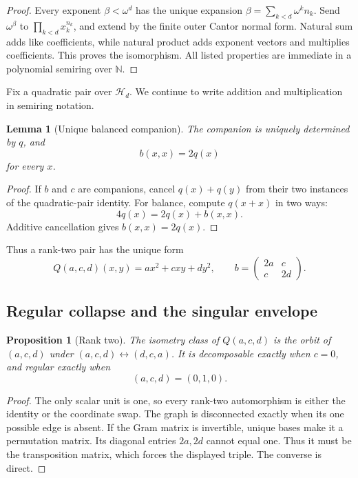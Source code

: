 \documentclass[11pt]{article}
\newtheorem{proposition}[theorem]{Proposition}
\newtheorem{lemma}[theorem]{Lemma}
\theoremstyle{definition}
\theoremstyle{remark}
\newcommand{\Nat}{\mathbb N}
\newcommand{\Hess}{\mathcal H}
\begin{document}
\begin{proof}
Every exponent \(\beta<\omega^d\) has the unique expansion
\(\beta=\sum_{k<d}\omega^kn_k\).  Send
\(\omega^\beta\) to \(\prod_{k<d}x_k^{n_k}\), and extend by the finite outer
Cantor normal form.  Natural sum adds like coefficients, while natural product
adds exponent vectors and multiplies coefficients.  This proves the
isomorphism.  All listed properties are immediate in a polynomial semiring
over \(\Nat\).
\end{proof}

Fix a quadratic pair over \(\Hess_d\).  We continue to write addition and
multiplication in semiring notation.

\begin{lemma}[Unique balanced companion]\label{lem:balanced}
The companion is uniquely determined by \(q\), and
\[
 b(x,x)=2q(x)
\]
for every \(x\).
\end{lemma}

\begin{proof}
If \(b\) and \(c\) are companions, cancel \(q(x)+q(y)\) from their two
instances of the quadratic-pair identity.  For balance, compute \(q(x+x)\) in
two ways:
\[
 4q(x)=2q(x)+b(x,x).
\]
Additive cancellation gives \(b(x,x)=2q(x)\).
\end{proof}

Thus a rank-two pair has the unique form
\[
 Q(a,c,d)(x,y)=ax^2+cxy+dy^2,\qquad
 b=\begin{pmatrix}2a&c\\c&2d\end{pmatrix}.
\]

\subsection{Regular collapse and the singular envelope}

\begin{proposition}[Rank two]\label{prop:hessranktwo}
The isometry class of \(Q(a,c,d)\) is the orbit of \((a,c,d)\) under
\((a,c,d)\leftrightarrow(d,c,a)\).  It is decomposable exactly when \(c=0\),
and regular exactly when
\[
 (a,c,d)=(0,1,0).
\]
\end{proposition}

\begin{proof}
The only scalar unit is one, so every rank-two automorphism is either the
identity or the coordinate swap.  The graph is disconnected exactly when its
one possible edge is absent.  If the Gram matrix is invertible, unique bases
make it a permutation matrix.  Its diagonal entries \(2a,2d\) cannot equal
one.  Thus it must be the transposition matrix, which forces the displayed
triple.  The converse is direct.
\end{proof}
\end{document}
